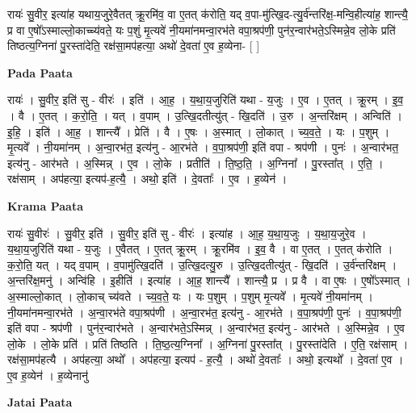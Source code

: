 \documentclass[17pt]{extarticle}
\begin{document}
रायः॑ सु॒वीर॒ इत्या॑ह यथाय॒जुरे॒वैतत् क्रू॒रमि॑व॒ वा ए॒तत् क॑रोति॒ यद् व॒पा-मु॑त्खि॒द-त्यु॒र्व॑न्तरि॑क्ष॒-मन्वि॒हीत्या॑ह॒ शान्त्यै॒ प्र वा ए॒षो᳚ऽस्माल्लो॒काच्च्य॑वते॒ यः प॒शुं मृ॒त्यवे॑ नी॒यमा॑नमन्वा॒रभ॑ते वपा॒श्रप॑णी॒ पुन॑र॒न्वार॑भते॒ऽस्मिन्ने॒व लो॒के प्रति॑ तिष्ठत्य॒ग्निना॑ पु॒रस्ता॑देति॒ रक्ष॑सा॒मप॑हत्या॒ अथो॑ दे॒वता॑ ए॒व ह॒व्येना- [  ] \newline

\textbf{Pada Paata} \newline

रायः॑ । सु॒वीर॒ इति॑ सु - वीरः॑ । इति॑ । आ॒ह॒ । य॒था॒य॒जुरिति॑ यथा - य॒जुः । ए॒व । ए॒तत् । क्रू॒रम् । इ॒व॒ । वै । ए॒तत् । क॒रो॒ति॒ । यत् । व॒पाम् । उ॒त्खि॒दतीत्यु॑त् - खि॒दति॑ । उ॒रु । अ॒न्तरि॑क्षम् । अन्विति॑ । इ॒हि॒ । इति॑ । आ॒ह॒ । शान्त्यै᳚ । प्रेति॑ । वै । ए॒षः । अ॒स्मात् । लो॒कात् । च्य॒व॒ते॒ । यः । प॒शुम् । मृ॒त्यवे᳚ । नी॒यमा॑नम् । अ॒न्वा॒रभ॑त॒ इत्य॑नु - आ॒रभ॑ते । व॒पा॒श्रप॑णी॒ इति॑ वपा - श्रप॑णी । पुनः॑ । अ॒न्वार॑भत॒ इत्य॑नु - आर॑भते । अ॒स्मिन्न् । ए॒व । लो॒के । प्रतीति॑ । ति॒ष्ठ॒ति॒ । अ॒ग्निना᳚ । पु॒रस्ता᳚त् । ए॒ति॒ । रक्ष॑साम् । अप॑हत्या॒ इत्यप॑-ह॒त्यै॒ । अथो॒ इति॑ । दे॒वताः᳚ । ए॒व । ह॒व्येन॑ ।  \newline


\textbf{Krama Paata} \newline

रायः॑ सु॒वीरः॑ । सु॒वीर॒ इति॑ । सु॒वीर॒ इति॑ सु - वीरः॑ । इत्या॑ह । आ॒ह॒ य॒था॒य॒जुः । य॒था॒य॒जुरे॒व । य॒था॒य॒जुरिति॑ यथा - य॒जुः । ए॒वैतत् । ए॒तत् क्रू॒रम् । क्रू॒रमि॑व । इ॒व॒ वै । वा ए॒तत् । ए॒तत् क॑रोति । क॒रो॒ति॒ यत् । यद् व॒पाम् । व॒पामु॑त्खि॒दति॑ । उ॒त्खि॒दत्यु॒रु । उ॒त्खि॒दतीत्यु॑त् - खि॒दति॑ । उ॒र्व॑न्तरि॑क्षम् । अ॒न्तरि॑क्ष॒मनु॑ । अन्वि॑हि । इ॒हीति॑ । इत्या॑ह । आ॒ह॒ शान्त्यै᳚ । शान्त्यै॒ प्र । प्र वै । वा ए॒षः । ए॒षो᳚ऽस्मात् । अ॒स्माल्लो॒कात् । लो॒काच् च्य॑वते । च्य॒व॒ते॒ यः । यः प॒शुम् । प॒शुम् मृ॒त्यवे᳚ । मृ॒त्यवे॑ नी॒यमा॑नम् । नी॒यमा॑नमन्वा॒रभ॑ते । अ॒न्वा॒रभ॑ते वपा॒श्रप॑णी । अ॒न्वा॒रभ॑त॒ इत्य॑नु - आ॒रभ॑ते । व॒पा॒श्रप॑णी॒ पुनः॑ । व॒पा॒श्रप॑णी॒ इति॑ वपा - श्रप॑णी । पुन॑र॒न्वार॑भते । अ॒न्वार॑भते॒ऽस्मिन्न् । अ॒न्वार॑भत॒ इत्य॑नु - आर॑भते । अ॒स्मिन्ने॒व । ए॒व लो॒के । लो॒के प्रति॑ । प्रति॑ तिष्ठति । ति॒ष्ठ॒त्य॒ग्निना᳚ । अ॒ग्निना॑ पु॒रस्ता᳚त् । पु॒रस्ता॑देति । ए॒ति॒ रक्ष॑साम् । रक्ष॑सा॒मप॑हत्यै । अप॑हत्या॒ अथो᳚ । अप॑हत्या॒ इत्यप॑ - ह॒त्यै॒ । अथो॑ दे॒वताः᳚ । अथो॒ इत्यथो᳚ । दे॒वता॑ ए॒व । ए॒व ह॒व्येन॑ । ह॒व्येनानु॑ \newline

\textbf{Jatai Paata} \newline
\end{document}
